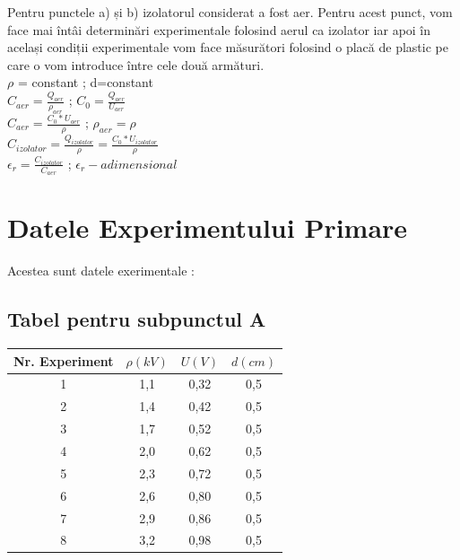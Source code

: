 \documentclass[12pt]{article}
\begin{document}
Pentru punctele a) și b) izolatorul considerat a fost aer. Pentru acest punct, vom face mai întâi determinări experimentale folosind aerul
ca izolator iar apoi în același condiții experimentale vom face măsurători folosind o placă de plastic pe care o vom introduce între cele două armături.\\

$\rho$ = constant ; d=constant \\

$C_{aer}=\frac{Q_{aer}}{\rho_{aer}}$  ;  $C_{0}=\frac{Q_{aer}}{U_{aer}}$\\

$C_{aer}=\frac{C_{0}*U_{aer}}{\rho}$  ; $\rho_{aer}=\rho$\\

$C_{izolator}=\frac{Q_{izolator}}{\rho}=\frac{C_{0}*U_{izolator}}{\rho}$\\

$\epsilon_{r}=\frac{C_{izolator}}{C_{aer}}$  ;  $\epsilon_{r}-adimensional$\\



\section{Datele Experimentului Primare}
Acestea sunt datele exerimentale : 

\subsection{Tabel pentru subpunctul A}

\begin{table}[h!]
    \centering
    \begin{tabular}{|c|c|c|c|}
        \hline
        Nr. Experiment & $\rho (kV)$ & $U (V)$  & $d (cm)$ \\
        \hline
        1 & 1,1 & 0,32 & 0,5 \\
        \hline
        2 & 1,4 & 0,42 & 0,5 \\
        \hline
        3 & 1,7 & 0,52 & 0,5 \\
        \hline
        4 & 2,0 & 0,62 & 0,5 \\
        \hline
        5 & 2,3 & 0,72 & 0,5 \\
        \hline
        6 & 2,6 & 0,80 & 0,5 \\
        \hline
        7 & 2,9 & 0,86 & 0,5 \\
        \hline
        8 & 3,2 & 0,98 & 0,5 \\
        \hline
    \end{tabular}
\end{table}
\end{document}

